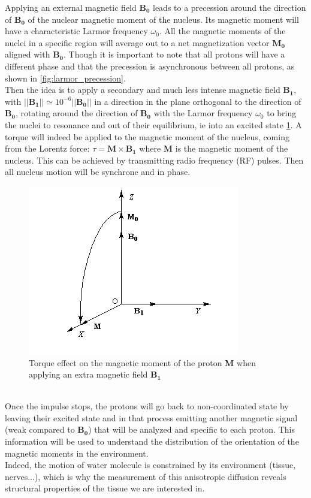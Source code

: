 Applying an external magnetic field $\mathbf{B_0}$ leads to a precession around the direction of $\mathbf{B_0}$ of the nuclear magnetic moment of the nucleus. Its magnetic moment will have a characteristic Larmor frequency $\omega_0$. All the magnetic moments of the nuclei in a specific region will average out to a net magnetization vector $\mathbf{M_0}$ aligned with $\mathbf{B_0}$. Though it is important to note that all protons will have a different phase and that the precession is asynchronous between all protons, as shown in \ref{fig:larmor_precession}.\\
Then the idea is to apply a secondary and much less intense magnetic field $\mathbf{B_1}$, with $||\mathbf{B_1}|| \simeq 10^{-6}||\mathbf{B_0}||$ in a direction in the plane orthogonal to the direction of $\mathbf{B_0}$, rotating around the direction of $\mathbf{B_0}$ with the Larmor frequency $\omega_0$ to bring the nuclei to resonance and out of their equilibrium, ie into an excited state \ref{fig:spin_excitation}. A torque will indeed be applied to the magnetic moment of the nucleus, coming from the Lorentz force: $\tau = \mathbf{M} \times \mathbf{B_1}$ where $\mathbf{M}$ is the magnetic moment of the nucleus. This can be achieved by transmitting radio frequency (RF) pulses. Then all nucleus motion will be synchrone and in phase.\\
\begin{figure}[h!]
    \centering
    \includegraphics[width=.5\textwidth]{figures/spin_excitation}
    \caption{Torque effect on the magnetic moment of the proton $\mathbf{M}$ when applying an extra magnetic field $\mathbf{B_1}$}
    \label{fig:spin_excitation}
\end{figure}
\\
Once the impulse stops, the protons will go back to non-coordinated state by leaving their excited state and in that process emitting another magnetic signal (weak compared to $\mathbf{B_0}$) that will be analyzed and specific to each proton. This information will be used to understand the distribution of the orientation of the magnetic moments in the environment.\\
Indeed, the motion of water molecule is constrained by its environment (tissue, nerves...), which is why the measurement of this anisotropic diffusion reveals structural properties of the tissue we are interested in.


